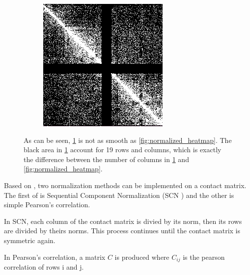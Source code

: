 \documentclass{article}
\begin{document}
\begin{figure}[H]
\begin{subfigure}[b]{.4\textwidth}
            \includegraphics[width=\textwidth]{figures/my_result.png}
            \caption{}
            \label{fig:my_result}
        \end{subfigure}
    \caption{As can be seen, \ref{fig:my_result} is not
                as smooth as \ref{fig:normalized_heatmap}.
                The black area in \ref{fig:my_result} account for 
                19 rows and columns, which is
                exactly the difference between the number of columns 
                in \ref{fig:my_result} and \ref{fig:normalized_heatmap}.
                }
    \label{fig:heatmap_comparison}
\end{figure}

Based on \cite{wang2013properties}, two normalization methods can be 
implemented on a contact matrix. The first of is Sequential Component 
Normalization (SCN \cite{cournac2012normalization})
and the other is simple Pearson's correlation. 

In SCN, each column of the contact matrix is divied by its norm, then
its rows are divided by theirs norms. This process continues until the 
contact matrix is symmetric again.

In Pearson's correlation, a matrix $C$ is produced where $C_{ij}$
is the pearson correlation of rows i and j. 
\end{document}
